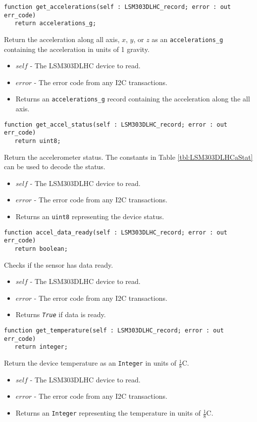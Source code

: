 \documentclass[10pt, openany]{book}
\newcommand{\constant}[1]{\emph{\texttt{#1}}}
\newcommand{\datatype}[1]{\texttt{#1}}
\begin{document}
\begin{lstlisting}
function get_accelerations(self : LSM303DLHC_record; error : out err_code)
   return accelerations_g;
\end{lstlisting}
Return the acceleration along all axis, $x$, $y$, or $z$ as an \datatype{accelerations\_g} containing the acceleration in units of 1 gravity.
\begin{itemize}
  \item $self$ - The LSM303DLHC device to read.
  \item $error$ - The error code from any I2C transactions.
  \item Returns an \datatype{accelerations\_g} record containing the acceleration along the all axis.
\end{itemize}

\begin{lstlisting}
function get_accel_status(self : LSM303DLHC_record; error : out err_code)
   return uint8;
\end{lstlisting}
Return the accelerometer status.  The constants in Table \ref{tbl:LSM303DLHCaStat} can be used to decode the status.
\begin{itemize}
  \item $self$ - The LSM303DLHC device to read.
  \item $error$ - The error code from any I2C transactions.
  \item Returns an \datatype{uint8} representing the device status.
\end{itemize}

\begin{lstlisting}
function accel_data_ready(self : LSM303DLHC_record; error : out err_code)
   return boolean;
\end{lstlisting}
Checks if the sensor has data ready.
\begin{itemize}
  \item $self$ - The LSM303DLHC device to read.
  \item $error$ - The error code from any I2C transactions.
  \item Returns \constant{True} if data is ready.
\end{itemize}

\begin{lstlisting}
function get_temperature(self : LSM303DLHC_record; error : out err_code)
   return integer;
\end{lstlisting}
Return the device temperature as an \datatype{Integer} in units of $\frac{1}{8}$\degree{}C.
\begin{itemize}
  \item $self$ - The LSM303DLHC device to read.
  \item $error$ - The error code from any I2C transactions.
  \item Returns an \datatype{Integer} representing the temperature in units of $\frac{1}{8}$\degree{}C.
\end{itemize}
\end{document}
